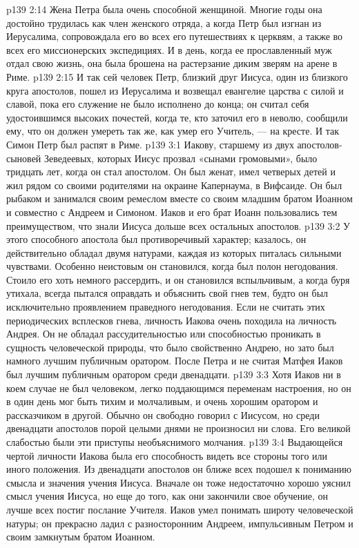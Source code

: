 \vs p139 2:14 \pc Жена Петра была очень способной женщиной. Многие годы она достойно трудилась как член женского отряда, а когда Петр был изгнан из Иерусалима, сопровождала его во всех его путешествиях к церквям, а также во всех его миссионерских экспедициях. И в день, когда ее прославленный муж отдал свою жизнь, она была брошена на растерзание диким зверям на арене в Риме.
\vs p139 2:15 \pc И так сей человек Петр, близкий друг Иисуса, один из близкого круга апостолов, пошел из Иерусалима и возвещал евангелие царства с силой и славой, пока его служение не было исполнено до конца; он считал себя удостоившимся высоких почестей, когда те, кто заточил его в неволю, сообщили ему, что он должен умереть так же, как умер его Учитель, --- на кресте. И так Симон Петр был распят в Риме.
\vs p139 3:1 Иакову, старшему из двух апостолов\hyp{}сыновей Зеведеевых, которых Иисус прозвал «сынами громовыми», было тридцать лет, когда он стал апостолом. Он был женат, имел четверых детей и жил рядом со своими родителями на окраине Капернаума, в Вифсаиде. Он был рыбаком и занимался своим ремеслом вместе со своим младшим братом Иоанном и совместно с Андреем и Симоном. Иаков и его брат Иоанн пользовались тем преимуществом, что знали Иисуса дольше всех остальных апостолов.
\vs p139 3:2 \pc У этого способного апостола был противоречивый характер; казалось, он действительно обладал двумя натурами, каждая из которых питалась сильными чувствами. Особенно неистовым он становился, когда был полон негодования. Стоило его хоть немного рассердить, и он становился вспыльчивым, а когда буря утихала, всегда пытался оправдать и объяснить свой гнев тем, будто он был исключительно проявлением праведного негодования. Если не считать этих периодических всплесков гнева, личность Иакова очень походила на личность Андрея. Он не обладал рассудительностью или способностью проникать в сущность человеческой природы, что было свойственно Андрею, но зато был намного лучшим публичным оратором. После Петра и не считая Матфея Иаков был лучшим публичным оратором среди двенадцати.
\vs p139 3:3 Хотя Иаков ни в коем случае не был человеком, легко поддающимся переменам настроения, но он в один день мог быть тихим и молчаливым, и очень хорошим оратором и рассказчиком в другой. Обычно он свободно говорил с Иисусом, но среди двенадцати апостолов порой целыми днями не произносил ни слова. Его великой слабостью были эти приступы необъяснимого молчания.
\vs p139 3:4 Выдающейся чертой личности Иакова была его способность видеть все стороны того или иного положения. Из двенадцати апостолов он ближе всех подошел к пониманию смысла и значения учения Иисуса. Вначале он тоже недостаточно хорошо уяснил смысл учения Иисуса, но еще до того, как они закончили свое обучение, он лучше всех постиг послание Учителя. Иаков умел понимать широту человеческой натуры; он прекрасно ладил с разносторонним Андреем, импульсивным Петром и своим замкнутым братом Иоанном.
